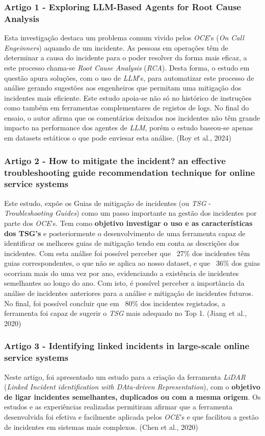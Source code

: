 		\subsubsection{Artigo 1 - Exploring LLM-Based Agents for Root Cause Analysis}
			Esta investigação destaca um problema comum vivido pelos \textit{OCE}'s (\textit{On Call Engeinners}) aquando de um incidente. As pessoas em operações têm de determinar a causa do incidente para o poder resolver da forma mais eficaz, a este processo chama-se \textit{Root Cause Analysis} (\textit{RCA}). Desta forma, o estudo em questão apura soluções, com o uso de \textit{LLM}'s, para automatizar este processo de análise gerando sugestões aos engenheiros que permitam uma mitigação dos incidentes mais eficiente. Este estudo apoia-se não só no histórico de instruções como também em ferramentas complementares de registos de logs. No final do ensaio, o autor afirma que os comentários deixados nos incidentes não têm grande impacto na performance dos agentes de \textit{LLM}, porém o estudo baseou-se apenas em datasets estáticos o que pode enviesar esta análise. (Roy et al., 2024)
	
		\subsubsection{Artigo 2 - How to mitigate the incident? an effective troubleshooting guide recommendation technique for online service systems}
			Este estudo, expõe os Guias de mitigação de incidentes (ou \textit{TSG} - \textit{Troubleshooting Guides}) como um passo importante na gestão dos incidentes por parte dos \textit{OCE}'s. Tem como \textbf{objetivo investigar o uso e as características dos TSG's} e posteriormente o desenvolvimento de uma ferramenta capaz de identificar os melhores guias de mitigação tendo em conta as descrições dos incidentes. Com esta análise foi possível perceber que ~27\% dos incidentes têm guias correspondentes, o que não se aplica ao nosso dataset, e que ~36\% dos guias ocorriam mais do uma vez por ano, evidenciando a existência de incidentes semelhantes ao longo do ano. Com isto, é possível perceber a importância da análise de incidentes anteriores para a análise e mitigação de incidentes futuros. No final, foi possível concluir que em ~80\% dos incidentes registados, a ferramenta foi capaz de sugerir o \textit{TSG} mais adequado no Top 1. (Jiang et al., 2020)
		
		\subsubsection{Artigo 3 - Identifying linked incidents in large-scale online service systems}
			Neste artigo, foi apresentado um estudo para a criação da ferramenta \textit{LiDAR} (\textit{Linked Incident identification with DAta-driven Representation}), com o \textbf{objetivo de ligar incidentes semelhantes, duplicados ou com a mesma origem}. Os estudos e as experiências realizadas permitiram afirmar que a ferramenta desenvolvida foi efetiva e facilmente aplicada pelos \textit{OCE}'s e que facilitou a gestão de incidentes em sistemas mais complexos. (Chen et al., 2020)
		
